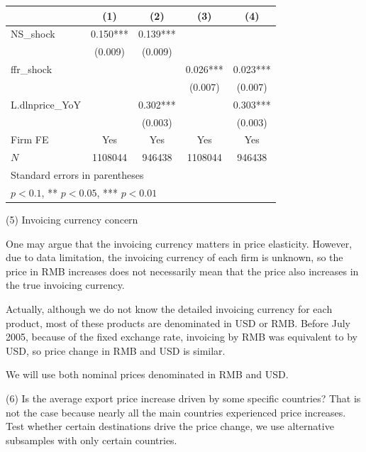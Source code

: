 \documentclass[12pt]{article}
\begin{document}
\begin{center}
\begin{tabular}{l*{4}{c}}
\toprule
            &\multicolumn{1}{c}{(1)}   &\multicolumn{1}{c}{(2)}   &\multicolumn{1}{c}{(3)}   &\multicolumn{1}{c}{(4)}   \\
\midrule
NS\_shock    &       0.150***&       0.139***&               &               \\
            &     (0.009)   &     (0.009)   &               &               \\
\addlinespace
ffr\_shock   &               &               &       0.026***&       0.023***\\
            &               &               &     (0.007)   &     (0.007)   \\
\addlinespace
L.dlnprice\_YoY&               &       0.302***&               &       0.303***\\
            &               &     (0.003)   &               &     (0.003)   \\
\addlinespace
Firm FE     &         Yes   &         Yes   &         Yes   &         Yes   \\
\midrule
\(N\)       &     1108044   &      946438   &     1108044   &      946438   \\
\bottomrule
\multicolumn{5}{l}{\footnotesize Standard errors in parentheses}\\
\multicolumn{5}{l}{\footnotesize * \(p<0.1\), ** \(p<0.05\), *** \(p<0.01\)}\\
\end{tabular}
\end{center}
(5) Invoicing currency concern

One may argue that the invoicing currency matters in price elasticity. However, due to data limitation, the invoicing currency of each firm is unknown, so the price in RMB increases does not necessarily mean that the price also increases in the true invoicing currency. 

Actually, although we do not know the detailed invoicing currency for each product, most of these products are denominated in USD or RMB. Before July 2005, because of the fixed exchange rate, invoicing by RMB was equivalent to by USD, so price change in RMB and USD is similar. 

We will use both nominal prices denominated in RMB and USD.

(6) Is the average export price increase driven by some specific countries?
That is not the case because nearly all the main countries experienced price increases. Test whether certain destinations drive the price change, we use alternative subsamples with only certain countries.
 
\end{document}
